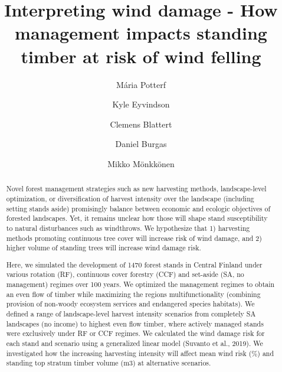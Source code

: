 \documentclass[]{elsarticle} %
\begin{document}
\begin{frontmatter}

  \title{Interpreting wind damage - How management impacts standing timber at risk of wind felling}
    \author[Department of Biological and Environmental Science]{Mária Potterf}
    \author[Department of Biological and Environmental Science]{Kyle Eyvindson}
    \author[Department of Biological and Environmental Science]{Clemens Blattert}
    \author[Department of Biological and Environmental Science]{Daniel Burgas}
    \author[Department of Biological and Environmental Science]{Mikko Mönkkönen}
      \address[University of Jyvaskyla]{Department of Biological and Environmental Science, University of Jyvaskyla, P.O. Box 35, FI-40014 Jyvaskyla, Finland}
    \address[Wisdom]{This is wisdom address}
    \address[LUKE]{THIS is Luke address Department, Street, City, State, Zip}
    \cortext[]{}
  
  \begin{abstract}
  Novel forest management strategies such as new harvesting methods, landscape-level optimization, or diversification of harvest intensity over the landscape (including setting stands aside) promisingly balance between economic and ecologic objectives of forested landscapes. Yet, it remains unclear how those will shape stand susceptibility to natural disturbances such as windthrows. We hypothesize that 1) harvesting methods promoting continuous tree cover will increase risk of wind damage, and 2) higher volume of standing trees will increase wind damage risk.
  
  Here, we simulated the development of 1470 forest stands in Central Finland under various rotation (RF), continuous cover forestry (CCF) and set-aside (SA, no management) regimes over 100 years. We optimized the management regimes to obtain an even flow of timber while maximizing the regions multifunctionality (combining provision of non-woody ecosystem services and endangered species habitats). We defined a range of landscape-level harvest intensity scenarios from completely SA landscapes (no income) to highest even flow timber, where actively managed stands were exclusively under RF or CCF regimes. We calculated the wind damage risk for each stand and scenario using a generalized linear model (Suvanto et al., 2019). We investigated how the increasing harvesting intensity will affect mean wind risk (\%) and standing top stratum timber volume (m3) at alternative scenarios.
  

\end{abstract}
\end{frontmatter}
\end{document}
